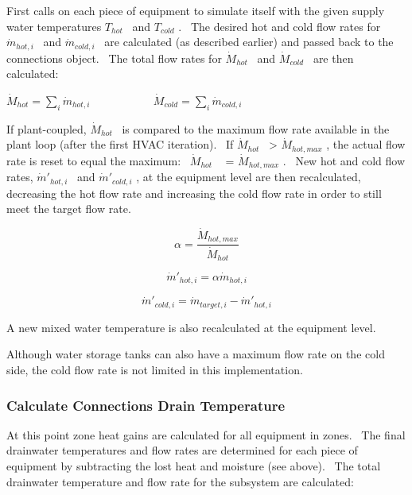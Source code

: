 First calls on each piece of equipment to simulate itself with the given supply water temperatures \({T_{hot}}\) ~and \({T_{cold}}\) .~ The desired hot and cold flow rates for \({\dot m_{hot,i}}\) ~and \({\dot m_{cold,i}}\) ~are calculated (as described earlier) and passed back to the connections object.~ The total flow rates for \({\dot M_{hot}}\) ~and \({\dot M_{cold}}\) ~are then calculated:

\({\dot M_{hot}} = \mathop \sum \limits_i {\dot m_{hot,i}}\) ~~~~~~~~~~ \({\dot M_{cold}} = \mathop \sum \limits_i {\dot m_{cold,i}}\)

If plant-coupled, \({\dot M_{hot}}\) ~is compared to the maximum flow rate available in the plant loop (after the first HVAC iteration).~ If \({\dot M_{hot}}\) ~\textgreater{} \({\dot M_{hot,max}}\) , the actual flow rate is reset to equal the maximum:~ \({\dot M_{hot}}\) ~ = \({\dot M_{hot,max}}\) .~ New hot and cold flow rates, \({\dot m'_{hot,i}}\) ~and \({\dot m'_{cold,i}}\) , at the equipment level are then recalculated, decreasing the hot flow rate and increasing the cold flow rate in order to still meet the target flow rate.

\begin{equation}
\alpha  = \frac{{{{\dot M}_{hot,max}}}}{{{{\dot M}_{hot}}}}
\end{equation}

\begin{equation}
{\dot m'_{hot,i}} = \alpha {\dot m_{hot,i}}
\end{equation}

\begin{equation}
{\dot m'_{cold,i}} = {\dot m_{target,i}} - {\dot m'_{hot,i}}
\end{equation}

A new mixed water temperature is also recalculated at the equipment level.

Although water storage tanks can also have a maximum flow rate on the cold side, the cold flow rate is not limited in this implementation.

\subsubsection{Calculate Connections Drain Temperature}\label{calculate-connections-drain-temperature}

At this point zone heat gains are calculated for all equipment in zones.~ The final drainwater temperatures and flow rates are determined for each piece of equipment by subtracting the lost heat and moisture (see above).~ The total drainwater temperature and flow rate for the subsystem are calculated:

